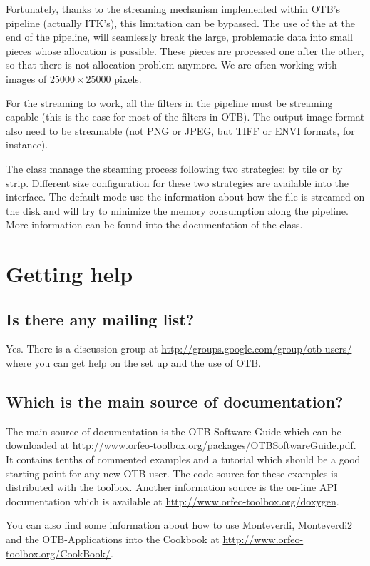 Fortunately, thanks to the streaming mechanism implemented within OTB's pipeline (actually ITK's), this limitation can be bypassed. The use of the  at the end of the pipeline, will seamlessly break the large, problematic data into small pieces whose allocation is possible. These pieces are processed one after the other, so that there is not allocation problem anymore. We are often working with images of $25000 \times 25000$ pixels.

For the streaming to work, all the filters in the pipeline must be streaming
capable (this is the case for most of the filters in OTB). The output image
format also need to be streamable (not PNG or JPEG, but TIFF or ENVI formats, for instance).

The class  manage the steaming process following two strategies: by tile or by strip. Different size configuration for these two strategies are available into the interface. The default mode use the information about how the file is streamed on the disk and will try to minimize the memory consumption along the pipeline. More information can be found into the documentation of the class. 


\section{Getting help}
\subsection{Is there any mailing list?}
Yes. There is a discussion group at
\url{http://groups.google.com/group/otb-users/} where you can get help
on the set up and the use of OTB.

\subsection{Which is the main source of documentation?}
The main source of documentation is the OTB Software Guide which can
be downloaded at
\url{http://www.orfeo-toolbox.org/packages/OTBSoftwareGuide.pdf}. It
contains tenths of commented examples and a tutorial which should be a good starting
point for any new OTB user. The code source for these examples is
distributed with the toolbox. Another information source is the
on-line API documentation which is available at \url{http://www.orfeo-toolbox.org/doxygen}.

You can also find some information about how to use Monteverdi, Monteverdi2 and the OTB-Applications into the Cookbook at \url{http://www.orfeo-toolbox.org/CookBook/}. 

